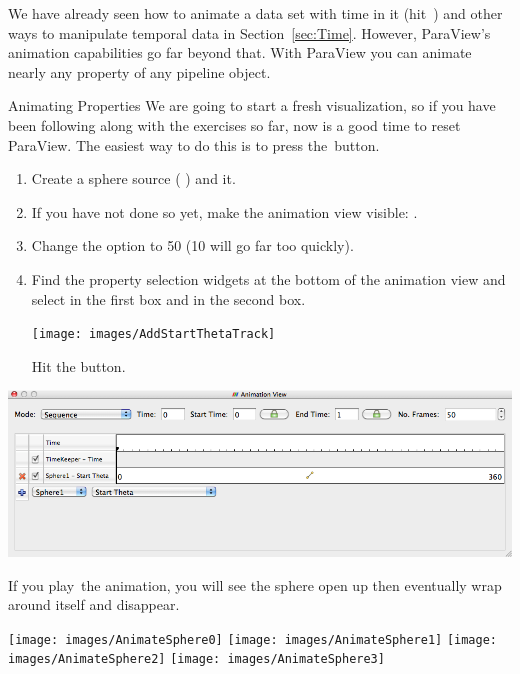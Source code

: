 We have already seen how to animate a data set with time in it
(hit~\vcrPlay) and other ways to manipulate temporal data in
Section~\ref{sec:Time}.  However, ParaView's animation capabilities go far
beyond that.  With ParaView you can animate nearly any property of any
pipeline object.

\begin{exercise}{Animating Properties}
  \label{ex:AnimatingProperties}%
  We are going to start a fresh visualization, so if you have been
  following along with the exercises so far, now is a good time to reset
  ParaView.  The easiest way to do this is to press the~\disconnect button.

  \begin{enumerate}
  \item Create a sphere source ( \ra {}) and \apply it.
  \item If you have not done so yet, make the animation view visible:
     \ra {}.
  \item Change the  option to 50 (10 will go far too quickly).
  \item Find the property selection widgets at the bottom of the animation
    view and select  in the first box and  in
    the second box.
    \begin{inlinefig}
      \texttt{[image: images/AddStartThetaTrack]}
    \end{inlinefig}
    Hit the  button.
  \end{enumerate}

  \begin{inlinefig}
    \includegraphics[width=.9\linewidth]{images/BuildAnimation1}
  \end{inlinefig}

  If you play~\vcrPlay the animation, you will see the sphere open up then
  eventually wrap around itself and disappear.

  \begin{inlinefig}
    \texttt{[image: images/AnimateSphere0]}
    \texttt{[image: images/AnimateSphere1]}
    \texttt{[image: images/AnimateSphere2]}
    \texttt{[image: images/AnimateSphere3]}
  \end{inlinefig}
\end{exercise}

